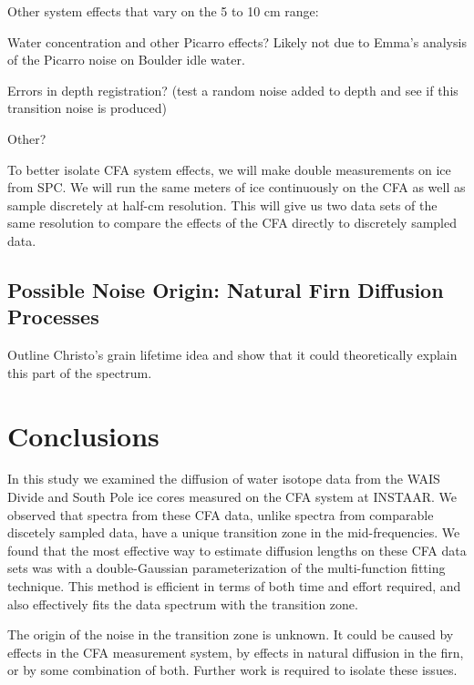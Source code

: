 \documentclass[draft, jgrga]{AGUTeX}
\begin{document}
\begin{article}
Other system effects that vary on the 5 to 10 cm range:

Water concentration and other Picarro effects? Likely not due to Emma's analysis of the Picarro noise on Boulder idle water.

Errors in depth registration? (test a random noise added to depth and see if this transition noise is produced)

Other?

To better isolate CFA system effects, we will make double measurements on ice from SPC. We will run the same meters of ice continuously on the CFA as well as sample discretely at half-cm resolution. This will give us two data sets of the same resolution to compare the effects of the CFA directly to discretely sampled data.

\subsection{Possible Noise Origin: Natural Firn Diffusion Processes}

Outline Christo's grain lifetime idea and show that it could theoretically explain this part of the spectrum.



\section{Conclusions}

In this study we examined the diffusion of water isotope data from the WAIS Divide and South Pole ice cores measured on the CFA system at INSTAAR. We observed that spectra from these CFA data, unlike spectra from comparable discetely sampled data, have a unique transition zone in the mid-frequencies. We found that the most effective way to estimate diffusion lengths on these CFA data sets was with a double-Gaussian parameterization of the multi-function fitting technique. This method is efficient in terms of both time and effort required, and also effectively fits the data spectrum with the transition zone.

The origin of the noise in the transition zone is unknown. It could be caused by effects in the CFA measurement system, by effects in natural diffusion in the firn, or by some combination of both. Further work is required to isolate these issues.





\end{article}
\end{document}
